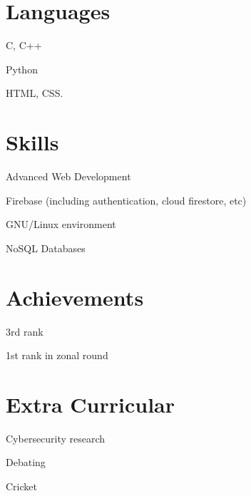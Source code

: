 \documentclass[]{deedy-resume-openfont}
\begin{document}
\begin{minipage}[t]{0.4\textwidth}

	\section{Languages}
	\hspace{0.5em}
	\begin{tightemize}
		\item C, C++
		\item Python
	\end{tightemize}
	\sectionsep
	\begin{tightemize}
		\item HTML, CSS.
	\end{tightemize}
	\sectionsep

	\section{Skills}
	\sectionsep
	\begin{tightemize}
		\item Advanced Web Development
		\item Firebase (including authentication, cloud firestore, etc)
		\item GNU/Linux environment
		\item NoSQL Databases
	\end{tightemize}
	\sectionsep

	\section{Achievements}
	\sectionsep
	\begin{tightemize}

		\item {}

		\item {}
		3rd rank

		\item {}
		1st rank in zonal round

	\end{tightemize}
	\sectionsep

	\section{Extra Curricular}
	\sectionsep
	\begin{tightemize}
		\item Cybersecurity research
		\item Debating
		\item Cricket
	
	\end{tightemize}
	\sectionsep

\end{minipage}
\end{document}
